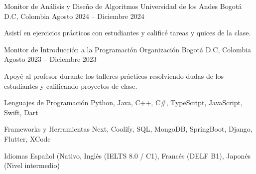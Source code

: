 \documentclass[11pt, a4paper]{awesome-cv}
\begin{document}
\begin{cventries}
  \cventry
    {Monitor de An\'alisis y Dise\~no de Algoritmos}
    {Universidad de los Andes}
    {Bogot\'a D.C, Colombia}
    {Agosto 2024 -- Diciembre 2024}
    {
      \begin{cvitems}
        \item {Asist\'i en ejercicios pr\'acticos con estudiantes y calific\'e tareas y quices de la clase.}
      \end{cvitems}
    }

  \cventry
    {Monitor de Introducci\'on a la Programaci\'on}
    {Organizaci\'on}
    {Bogot\'a D.C, Colombia}
    {Agosto 2023 -- Diciembre 2023}
    {
      \begin{cvitems}
        \item {Apoy\'e al profesor durante los talleres pr\'acticos resolviendo dudas de los estudiantes y calificando proyectos de clase.}
      \end{cvitems}
    }

\end{cventries}


\begin{cvskills}

  \cvskill
    {Lenguajes de Programaci\'on}
    {Python, Java, C++, C\#, TypeScript, JavaScript, Swift, Dart}

  \cvskill
    {Frameworks y Herramientas}
    {Next, Coolify, SQL, MongoDB, SpringBoot, Django, Flutter, XCode}

  \cvskill
    {Idiomas}
    {Espa\~nol (Nativo, Ingl\'es (IELTS 8.0 / C1), Franc\'es (DELF B1), Japon\'es (Nivel intermedio)}

\end{cvskills}
\end{document}
